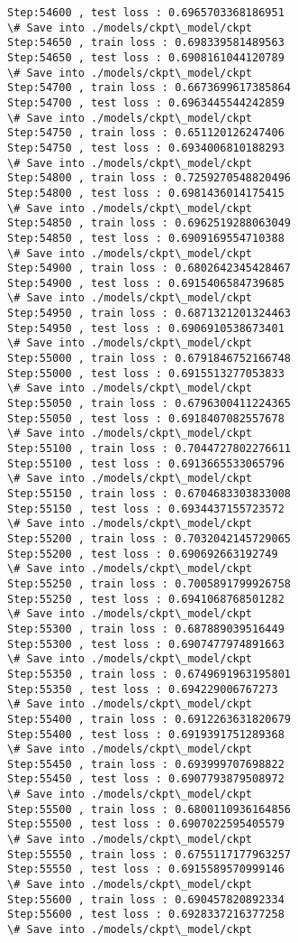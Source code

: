 \documentclass[11pt]{article}
\begin{document}
\begin{Verbatim}[commandchars=\\\{\}]
Step:54600 , test loss : 0.6965703368186951
\# Save into ./models/ckpt\_model/ckpt
Step:54650 , train loss : 0.698339581489563
Step:54650 , test loss : 0.6908161044120789
\# Save into ./models/ckpt\_model/ckpt
Step:54700 , train loss : 0.6673699617385864
Step:54700 , test loss : 0.6963445544242859
\# Save into ./models/ckpt\_model/ckpt
Step:54750 , train loss : 0.651120126247406
Step:54750 , test loss : 0.6934006810188293
\# Save into ./models/ckpt\_model/ckpt
Step:54800 , train loss : 0.7259270548820496
Step:54800 , test loss : 0.6981436014175415
\# Save into ./models/ckpt\_model/ckpt
Step:54850 , train loss : 0.6962519288063049
Step:54850 , test loss : 0.6909169554710388
\# Save into ./models/ckpt\_model/ckpt
Step:54900 , train loss : 0.6802642345428467
Step:54900 , test loss : 0.6915406584739685
\# Save into ./models/ckpt\_model/ckpt
Step:54950 , train loss : 0.6871321201324463
Step:54950 , test loss : 0.6906910538673401
\# Save into ./models/ckpt\_model/ckpt
Step:55000 , train loss : 0.6791846752166748
Step:55000 , test loss : 0.6915513277053833
\# Save into ./models/ckpt\_model/ckpt
Step:55050 , train loss : 0.6796300411224365
Step:55050 , test loss : 0.6918407082557678
\# Save into ./models/ckpt\_model/ckpt
Step:55100 , train loss : 0.7044727802276611
Step:55100 , test loss : 0.6913665533065796
\# Save into ./models/ckpt\_model/ckpt
Step:55150 , train loss : 0.6704683303833008
Step:55150 , test loss : 0.6934437155723572
\# Save into ./models/ckpt\_model/ckpt
Step:55200 , train loss : 0.7032042145729065
Step:55200 , test loss : 0.690692663192749
\# Save into ./models/ckpt\_model/ckpt
Step:55250 , train loss : 0.7005891799926758
Step:55250 , test loss : 0.6941068768501282
\# Save into ./models/ckpt\_model/ckpt
Step:55300 , train loss : 0.687889039516449
Step:55300 , test loss : 0.6907477974891663
\# Save into ./models/ckpt\_model/ckpt
Step:55350 , train loss : 0.6749691963195801
Step:55350 , test loss : 0.694229006767273
\# Save into ./models/ckpt\_model/ckpt
Step:55400 , train loss : 0.6912263631820679
Step:55400 , test loss : 0.6919391751289368
\# Save into ./models/ckpt\_model/ckpt
Step:55450 , train loss : 0.693999707698822
Step:55450 , test loss : 0.6907793879508972
\# Save into ./models/ckpt\_model/ckpt
Step:55500 , train loss : 0.6800110936164856
Step:55500 , test loss : 0.6907022595405579
\# Save into ./models/ckpt\_model/ckpt
Step:55550 , train loss : 0.6755117177963257
Step:55550 , test loss : 0.6915589570999146
\# Save into ./models/ckpt\_model/ckpt
Step:55600 , train loss : 0.690457820892334
Step:55600 , test loss : 0.6928337216377258
\# Save into ./models/ckpt\_model/ckpt

\end{Verbatim}
\end{document}
